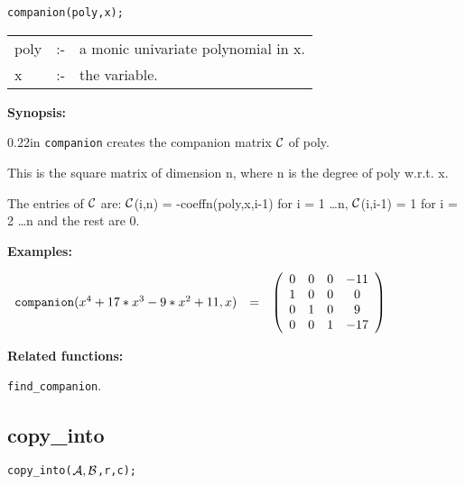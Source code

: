 
\hspace*{0.175in} {\tt companion(poly,x);}

\hspace*{0.1in}
\begin{tabular}{l l l}
poly &:-& a monic univariate polynomial in x. \\
x    &:-& the variable.
\end{tabular}

{\bf Synopsis:} %


\begin{addtolength}{\leftskip}{0.22in}
                {\tt companion} creates the companion matrix ${\cal C}$
                of poly.

This is the square matrix of dimension n, where n is the degree of poly
w.r.t. x.

The entries of ${\cal C}$ are:
                ${\cal C}$(i,n) = -coeffn(poly,x,i-1) for i = 1
                \ldots n, ${\cal C}$(i,i-1) = 1 for i = 2 \ldots n and
                the rest are 0.

\end{addtolength}


{\bf Examples:}

\begin{flushleft}
\hspace*{0.1in}
\begin{math}
\begin{array}{ccc}
{\tt companion}(x^4+17*x^3-9*x^2+11,x) & = &
\left( \begin{array}{cccc} 0 & 0 & 0 & -11 \\ 1 & 0 & 0 & 0 \\
0 & 1 & 0 & 9 \\ 0 & 0 & 1 & -17
\end{array} \right)
\end{array}
\end{math}
\end{flushleft}

{\bf Related functions:}

\hspace*{0.175in} {\tt find\_companion}.


\subsection{copy\_into}


\hspace*{0.175in} {\tt copy\_into(${\cal A,B}$,r,c);}

